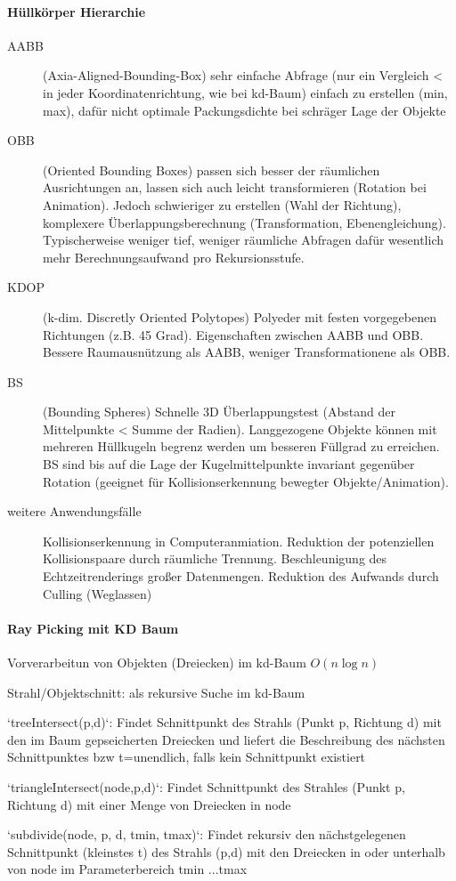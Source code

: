 \documentclass[landscape]{article}
\begin{document}
\begin{multicols}{3}
  \paragraph{Hüllkörper Hierarchie}
  \begin{description}
    \item[AABB] (Axia-Aligned-Bounding-Box) sehr einfache Abfrage (nur ein Vergleich < in jeder Koordinatenrichtung, wie bei kd-Baum) einfach zu erstellen (min, max), dafür nicht optimale Packungsdichte bei schräger Lage der Objekte
    \item[OBB] (Oriented Bounding Boxes) passen sich besser der räumlichen Ausrichtungen an, lassen sich auch leicht transformieren (Rotation bei Animation). Jedoch schwieriger zu erstellen (Wahl der Richtung), komplexere Überlappungsberechnung (Transformation, Ebenengleichung). Typischerweise weniger tief, weniger räumliche Abfragen dafür wesentlich mehr Berechnungsaufwand pro Rekursionsstufe.
    \item[KDOP] (k-dim. Discretly Oriented Polytopes) Polyeder mit festen vorgegebenen Richtungen (z.B. 45 Grad). Eigenschaften zwischen AABB und OBB. Bessere Raumausnützung als AABB, weniger Transformationene als OBB.
    \item[BS] (Bounding Spheres) Schnelle 3D Überlappungstest (Abstand der Mittelpunkte < Summe der Radien). Langgezogene Objekte können mit mehreren Hüllkugeln begrenz werden um besseren Füllgrad zu erreichen. BS sind bis auf die Lage der Kugelmittelpunkte invariant gegenüber Rotation (geeignet für Kollisionserkennung bewegter Objekte/Animation).
    \item[weitere Anwendungsfälle] Kollisionserkennung in Computeranmiation. Reduktion der potenziellen Kollisionspaare durch räumliche Trennung. Beschleunigung des Echtzeitrenderings großer Datenmengen. Reduktion des Aufwands durch Culling (Weglassen)
  \end{description}
  
  \paragraph{Ray Picking mit KD Baum}
  \begin{itemize*}
    \item Vorverarbeitun von Objekten (Dreiecken) im kd-Baum $O(n \log n)$
    \item Strahl/Objektschnitt: als rekursive Suche im kd-Baum
    \item `treeIntersect(p,d)`: Findet Schnittpunkt des Strahls (Punkt p, Richtung d) mit den im Baum gepseicherten Dreiecken und liefert die Beschreibung des nächsten Schnittpunktes bzw t=unendlich, falls kein Schnittpunkt existiert
    \item `triangleIntersect(node,p,d)`: Findet Schnittpunkt des Strahles (Punkt p, Richtung d) mit einer Menge von Dreiecken in node
    \item `subdivide(node, p, d, tmin, tmax)`: Findet rekursiv den nächstgelegenen Schnittpunkt (kleinstes t) des Strahls (p,d) mit den Dreiecken in oder unterhalb von node im Parameterbereich tmin ...tmax
  \end{itemize*}
  

\end{multicols}
\end{document}
